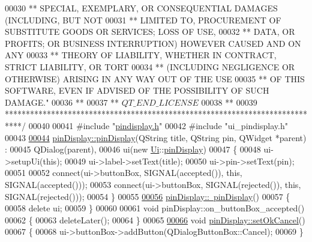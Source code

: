 \begin{DoxyCode}
00030 \textcolor{comment}{** SPECIAL, EXEMPLARY, OR CONSEQUENTIAL DAMAGES (INCLUDING, BUT NOT}
00031 \textcolor{comment}{** LIMITED TO, PROCUREMENT OF SUBSTITUTE GOODS OR SERVICES; LOSS OF USE,}
00032 \textcolor{comment}{** DATA, OR PROFITS; OR BUSINESS INTERRUPTION) HOWEVER CAUSED AND ON ANY}
00033 \textcolor{comment}{** THEORY OF LIABILITY, WHETHER IN CONTRACT, STRICT LIABILITY, OR TORT}
00034 \textcolor{comment}{** (INCLUDING NEGLIGENCE OR OTHERWISE) ARISING IN ANY WAY OUT OF THE USE}
00035 \textcolor{comment}{** OF THIS SOFTWARE, EVEN IF ADVISED OF THE POSSIBILITY OF SUCH DAMAGE."}
00036 \textcolor{comment}{**}
00037 \textcolor{comment}{** $QT\_END\_LICENSE$}
00038 \textcolor{comment}{**}
00039 \textcolor{comment}{****************************************************************************/}
00040 
00041 \textcolor{preprocessor}{#include "\hyperlink{pindisplay_8h}{pindisplay.h}"}
00042 \textcolor{preprocessor}{#include "ui\_pindisplay.h"}
00043 
\hypertarget{pindisplay_8cpp_source.tex_l00044}{}\hyperlink{classpinDisplay_a36cbc413bef6dbb2b35d22034e09d954}{00044} \hyperlink{classpinDisplay_a36cbc413bef6dbb2b35d22034e09d954}{pinDisplay::pinDisplay}(QString title, QString pin, QWidget *parent) :
00045     QDialog(parent),
00046     ui(new \hyperlink{namespaceUi}{Ui}::\hyperlink{classpinDisplay}{pinDisplay})
00047 \{
00048     ui->setupUi(\textcolor{keyword}{this});
00049     ui->label->setText(title);
00050     ui->pin->setText(pin);
00051 
00052     connect(ui->buttonBox, SIGNAL(accepted()), \textcolor{keyword}{this}, SIGNAL(accepted()));
00053     connect(ui->buttonBox, SIGNAL(rejected()), \textcolor{keyword}{this}, SIGNAL(rejected()));
00054 \}
00055 
\hypertarget{pindisplay_8cpp_source.tex_l00056}{}\hyperlink{classpinDisplay_a9f0d6882b7e823bf510390701f5e2f85}{00056} \hyperlink{classpinDisplay_a9f0d6882b7e823bf510390701f5e2f85}{pinDisplay::~pinDisplay}()
00057 \{
00058     \textcolor{keyword}{delete} ui;
00059 \}
00060 
00061 \textcolor{keywordtype}{void} pinDisplay::on\_buttonBox\_accepted()
00062 \{
00063     deleteLater();
00064 \}
00065 
\hypertarget{pindisplay_8cpp_source.tex_l00066}{}\hyperlink{classpinDisplay_a1a00155d5f7c1e3c1c7512cf5a2670af}{00066} \textcolor{keywordtype}{void} \hyperlink{classpinDisplay_a1a00155d5f7c1e3c1c7512cf5a2670af}{pinDisplay::setOkCancel}()
00067 \{
00068     ui->buttonBox->addButton(QDialogButtonBox::Cancel);
00069 \}
\end{DoxyCode}
